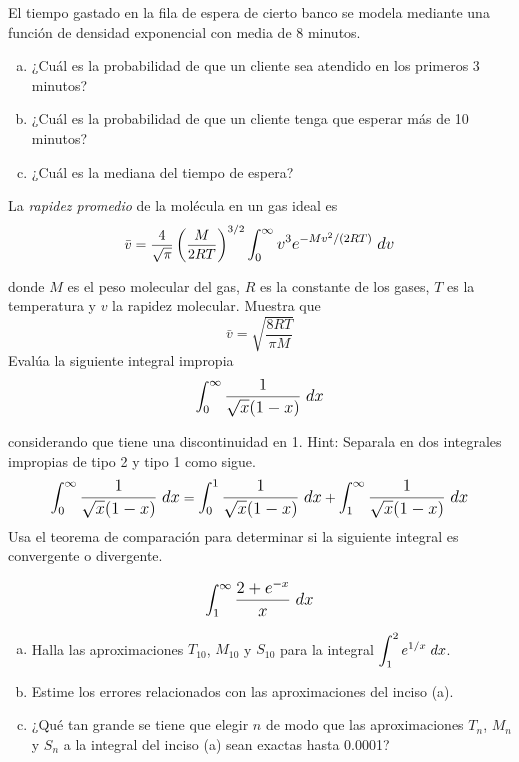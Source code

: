 \documentclass[9pt]{exam}
\begin{document}
\begin{questions}
\vskip10pt
\question
El tiempo gastado en la fila de espera de cierto banco se modela mediante una función de densidad exponencial con media de 8 minutos.
\begin{enumerate}[a)]
\item ¿Cuál es la probabilidad de que un cliente sea atendido en los primeros 3 minutos?
\item ¿Cuál es la probabilidad de que un cliente tenga que esperar más de 10 minutos?
\item ¿Cuál es la mediana del tiempo de espera?
\end{enumerate}
\vskip10pt
    \question La \textit{rapidez promedio} de la molécula en un gas ideal es
    $$\bar{v}=\frac{4}{\sqrt{\pi}}\left(\frac{M}{2RT}\right)^{3/2}\mathlarger{\int_0^\infty v^3e^{-Mv^2/(2RT)}\;dv}$$
    
    donde $M$ es el peso molecular del gas, $R$ es la constante de los gases, $T$ es la temperatura y $v$ la rapidez molecular. Muestra que
    $$\bar{v}=\sqrt{\frac{8RT}{\pi M}}$$
\vskip12pt    
    \question Evalúa la siguiente integral impropia 
    $$\mathlarger{\int_0^{\infty} \frac{1}{\sqrt{x}(1-x)}\;dx}$$
    
    considerando que tiene una discontinuidad en 1. Hint: Separala en dos integrales impropias de tipo 2 y tipo 1 como sigue. 
        $$\mathlarger{\int_0^{\infty} \frac{1}{\sqrt{x}(1-x)}\;dx}=\mathlarger{\int_0^1 \frac{1}{\sqrt{x}(1-x)}\;dx}+\mathlarger{\int_1^{\infty} \frac{1}{\sqrt{x}(1-x)}\;dx}$$
\vskip12pt    
    \question Usa el teorema de comparación para determinar si la siguiente integral es convergente o divergente. 
    
    $$\mathlarger{\int_1^{\infty}\frac{2+e^{-x}}{x}\;dx}$$
  
  
  
 \vskip10pt 
  \question 
  \begin{enumerate}[(a)]
  \item Halla las aproximaciones $T_{10}$, $M_{10}$ y $S_{10}$ para la integral $\mathlarger{\int_1^2e^{1/x}\;dx}$.
  \item Estime los errores relacionados con las aproximaciones del inciso (a).
  \item ¿Qué tan grande se tiene que elegir $n$ de modo que las aproximaciones $T_n$, $M_n$ y $S_n$ a la integral del inciso (a) sean exactas hasta 0.0001?
  \end{enumerate}
  
    \end{questions}
\end{document}
